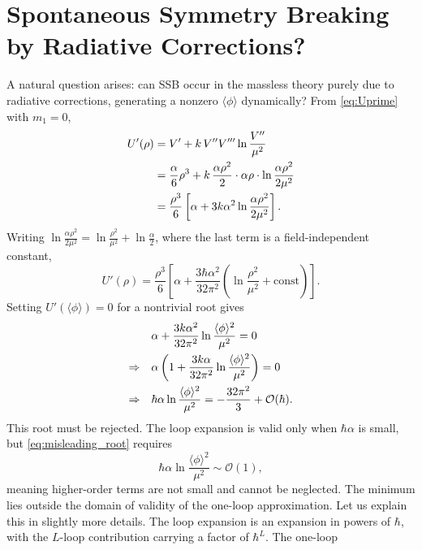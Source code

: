 \section{Spontaneous Symmetry Breaking by Radiative Corrections?}

A natural question arises: can SSB occur in the massless theory purely
due to radiative corrections, generating a nonzero $\langle\phi\rangle$
dynamically? From \eqref{eq:Uprime} with $m_1=0$,
\begin{align}
    U'(\rho) &= V' + k\,V''V'''\ln\frac{V''}{\mu^2} \notag\\
    &= \frac{\alpha}{6}\rho^3 + k\,\frac{\alpha\rho^2}{2}\cdot\alpha\rho
    \cdot\ln\frac{\alpha\rho^2}{2\mu^2} \notag\\
    &= \frac{\rho^3}{6}\left[\alpha
    + 3k\alpha^2\ln\frac{\alpha\rho^2}{2\mu^2}\right].
\end{align}
Writing $\ln\frac{\alpha\rho^2}{2\mu^2}
= \ln\frac{\rho^2}{\mu^2} + \ln\frac{\alpha}{2}$, where the last term is
a field-independent constant,
\begin{equation}
    U'(\rho) = \frac{\rho^3}{6}\left[\alpha
    + \frac{3\hbar\alpha^2}{32\pi^2}
    \left(\ln\frac{\rho^2}{\mu^2}
    + \text{const}\right)\right].
    \label{eq:first_derivative_potential}
\end{equation}
Setting $U'(\langle\phi\rangle)=0$ for a nontrivial root gives
\begin{align}
    &\alpha + \frac{3k\alpha^2}{32\pi^2}
    \ln\frac{\langle\phi\rangle^2}{\mu^2} = 0 \notag\\
    \Rightarrow\quad
    &\alpha\left(1 + \frac{3k\alpha}{32\pi^2}
    \ln\frac{\langle\phi\rangle^2}{\mu^2}\right) = 0 \notag\\
    \Rightarrow\quad
    &\hbar\alpha\ln\frac{\langle\phi\rangle^2}{\mu^2}
    = -\frac{32\pi^2}{3} + \mathcal{O}(\hbar).
    \label{eq:misleading_root}
\end{align}
This root must be rejected. The loop expansion is valid only when
$\hbar\alpha$ is small, but \eqref{eq:misleading_root} requires
\begin{equation}
    \hbar\alpha\ln\frac{\langle\phi\rangle^2}{\mu^2}
    \sim \mathcal{O}(1),
\end{equation}
meaning higher-order terms are not small and cannot be neglected. The
minimum lies outside the domain of validity of the one-loop approximation. Let us explain this in slightly more details. The loop expansion is an expansion in powers of $\hbar$, with the
$L$-loop contribution carrying a factor of $\hbar^L$. The one-loop
